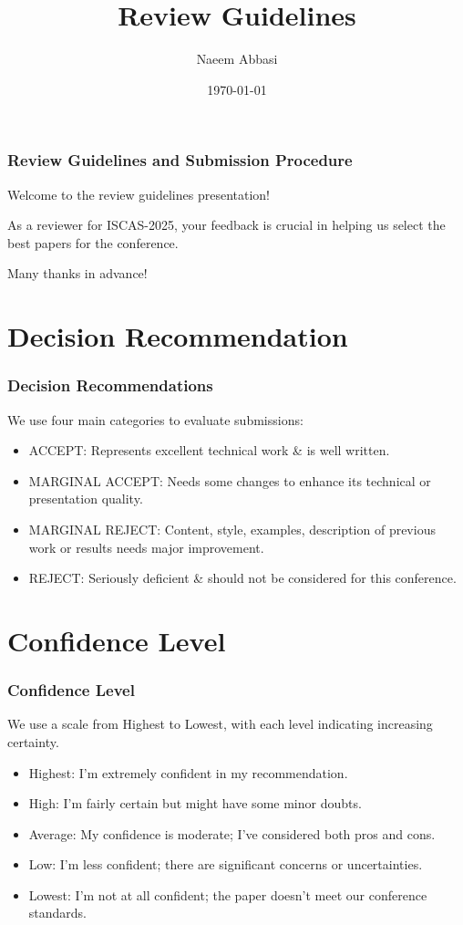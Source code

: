 \documentclass{beamer}
\title{Review Guidelines}
\author{Naeem Abbasi}
\date{\today}
\institute{Institution}
\begin{document}
\begin{frame}
    \frametitle{Review Guidelines and Submission Procedure}
    \bigskip
    Welcome to the review guidelines presentation!
    
    \bigskip
    As a reviewer for ISCAS-2025, your feedback is crucial in helping us select the best papers for the conference.

    \bigskip
    Many thanks in advance!
\end{frame}

\section*{Decision Recommendation}
\begin{frame}
    \frametitle{Decision Recommendations}
    \bigskip
    We use four main categories to evaluate submissions:
    \begin{itemize}
        \item ACCEPT: Represents excellent technical work \& is well written.
        \item MARGINAL ACCEPT: Needs some changes to enhance its technical or presentation quality.
        \item MARGINAL REJECT: Content, style, examples, description of previous work or results needs major improvement.
        \item REJECT: Seriously deficient \& should not be considered for this conference.
    \end{itemize}
\bigskip
\end{frame}

\section*{Confidence Level}
\begin{frame}
    \frametitle{Confidence Level}
    \bigskip
    We use a scale from Highest to Lowest, with each level indicating increasing certainty.
    \begin{itemize}
        \item Highest: I'm extremely confident in my recommendation.
        \item High: I'm fairly certain but might have some minor doubts.
        \item Average: My confidence is moderate; I've considered both pros and cons.
        \item Low: I'm less confident; there are significant concerns or uncertainties.
        \item Lowest: I'm not at all confident; the paper doesn't meet our conference standards.
    \end{itemize}
\bigskip
\end{frame}
\end{document}

